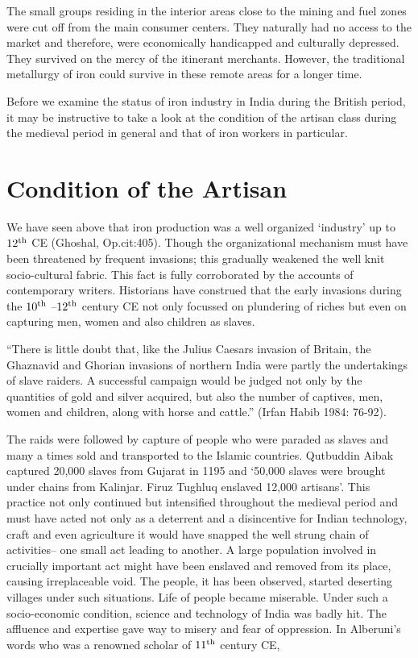 The small groups residing in the interior areas close to the mining and fuel zones were cut off from the main consumer centers. They naturally had no access to the market and therefore, were economically handicapped and culturally depressed. They survived on the mercy of the itinerant merchants. However, the traditional metallurgy of iron could survive in these remote areas for a longer time.

Before we examine the status of iron industry in India during the British period, it may be instructive to take a look at the condition of the artisan class during the medieval period in general and that of iron workers in particular. 

\vspace{-.3cm}

\section*{Condition of the Artisan}\label{chapter5-section-4}

We have seen above that iron production was a well organized ‘industry’ up to $12^{\rm th}$ CE (Ghoshal, Op.cit:405). Though the organizational mechanism must have been threatened by frequent invasions; this gradually weakened the well knit socio-cultural fabric. This fact is fully corroborated by the accounts of contemporary writers. Historians have construed that the early invasions during the $10^{\rm th}$ –$12^{\rm th}$ century CE not only focussed on plundering of riches but even on capturing men, women and also children as slaves. 

“There is little doubt that, like the Julius Caesars invasion of Britain, the Ghaznavid and Ghorian invasions of northern India were partly the undertakings of slave raiders. A successful campaign would be judged not only by the quantities of gold and silver acquired, but also the number of captives, men, women and children, along with horse and cattle.” (Irfan Habib 1984: 76-92).

The raids were followed by capture of people who were paraded as slaves and many a times sold and transported to the Islamic countries. Qutbuddin Aibak captured 20,000 slaves from Gujarat in 1195 and `50,000 slaves were brought under chains from Kalinjar. Firuz Tughluq enslaved 12,000 artisans'. This practice not only continued but intensified throughout the medieval period and must have acted not only as a deterrent and a disincentive for Indian technology, craft and even agriculture it would have snapped the well strung chain of activities– one small act leading to another. A large population involved in crucially important act might have been enslaved and removed from its place, causing irreplaceable void. The people, it has been observed, started deserting villages under such situations. Life of people became miserable. Under such a socio-economic condition, science and technology of India was badly hit. The affluence and expertise gave way to misery and fear of oppression. In Alberuni's words who was a renowned scholar of $11^{\rm th}$ century CE,

